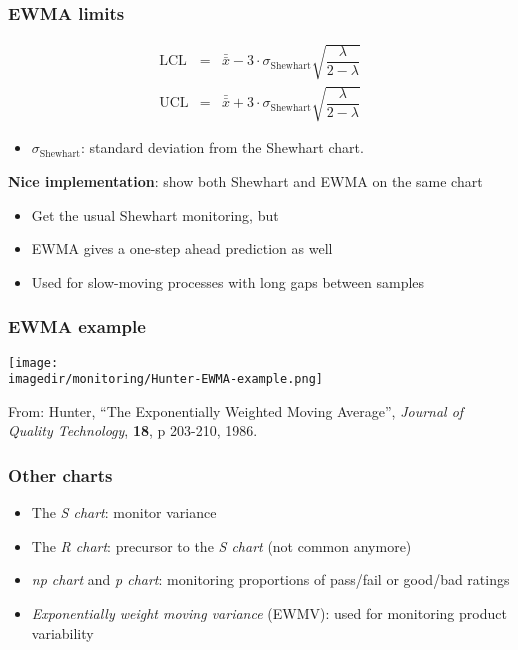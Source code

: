 \begin{frame}\frametitle{EWMA limits}

	$$
	\begin{array}{rcl}
		\text{LCL} &=& \bar{\bar{x}} - 3 \cdot \sigma_{\text{Shewhart}}\sqrt{\dfrac{\lambda}{2-\lambda}} \\
		\text{UCL} &=& \bar{\bar{x}} + 3 \cdot \sigma_{\text{Shewhart}} \sqrt{\dfrac{\lambda}{2-\lambda}}
	\end{array}
	$$
	\begin{itemize}
		\item	$\sigma_{\text{Shewhart}}$: standard deviation from the Shewhart chart.
	\end{itemize}

	\vspace{12pt}
	\textbf{Nice implementation}: show both Shewhart and EWMA on the same chart
	\begin{itemize}
		\item	Get the usual Shewhart monitoring, but
		\item	EWMA gives a one-step ahead prediction as well
		\item	Used for slow-moving processes with long gaps between samples
	\end{itemize}
\end{frame}

\begin{frame}\frametitle{EWMA example}

	\texttt{[image: \\imagedir/monitoring/Hunter-EWMA-example.png]}

	From: Hunter, ``The Exponentially Weighted Moving Average'', \emph{Journal of Quality Technology}, \textbf{18}, p 203-210, 1986.
\end{frame}

\begin{frame}\frametitle{Other charts}
	\begin{itemize}
		\item	The \emph{S chart}: monitor variance
		\item	The \emph{R chart}: precursor to the \emph{S chart} (not common anymore)
		\item	\emph{np chart} and \emph{p chart}: monitoring proportions of pass/fail or good/bad ratings
		\item	\emph{Exponentially weight moving variance} (EWMV): used for monitoring product variability
	\end{itemize}
\end{frame}

